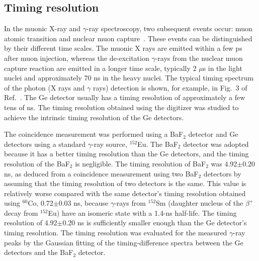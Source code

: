 \subsection{Timing resolution} \label{sec:timing}
In the muonic X-ray and $\gamma$-ray spectroscopy, two subsequent events occur: muon atomic transition and nuclear muon capture~\cite{Measday2001-mw}.
These events can be distinguished by their different time scales. The muonic X rays are emitted within a few ps after muon injection, whereas the de-excitation $\gamma$-rays from the nuclear muon capture reaction are emitted in a longer time scale, typically 2 $\mu$s in the light nuclei and approximately 70 ns in the heavy nuclei.
The typical timing spectrum of the photon (X rays and $\gamma$ rays) detection is shown, for example, in Fig.~3 of Ref.~\cite{Saito2022-wl}.
The Ge detector usually has a timing resolution of approximately a few tens of ns. The timing resolution obtained using the digitizer was studied to achieve the intrinsic timing resolution of the Ge detectors.

The coincidence measurement was performed using a BaF$_2$ detector and Ge detectors using a standard $\gamma$-ray source, $^{152}$Eu.
The BaF$_2$ detector was adopted because it has a better timing resolution than the Ge detectors, and the timing resolution of the BaF$_2$ is negligible.
The timing resolution of BaF$_2$ was 4.92$\pm$0.20 ns, as deduced from a coincidence measurement using two BaF$_2$ detectors by assuming that the timing resolution of two detectors is the same.
This value is relatively worse compared with the same detector's timing resolution obtained using $^{60}$Co, 0.72$\pm$0.03 ns, 
because $\gamma$-rays from $^{152}$Sm (daughter nucleus of the $\beta^+$ decay from $^{152}$Eu) have an isomeric state with a 1.4-ns half-life. The timing resolution of 4.92$\pm$0.20 ns is sufficiently smaller enough than the Ge detector's timing resolution.
The timing resolution was evaluated for the measured $\gamma$-ray peaks by the Gaussian fitting of the timing-difference spectra between the Ge detectors and the BaF$_2$ detector.

